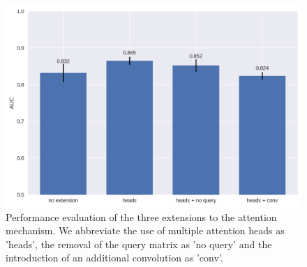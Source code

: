 \begin{figure}
	\centering\includegraphics[width=1\textwidth]{../visualizations/ch5-results/attn_extension_barcharts.png} 
	\caption{Performance evaluation of the three extensions to the attention mechanism. We abbreviate the use of multiple attention heads as 'heads', the removal of the query matrix as 'no query' and the introduction of an additional convolution as 'conv'. }
	\label{fig:attn_extension_barcharts}
\end{figure}



%
